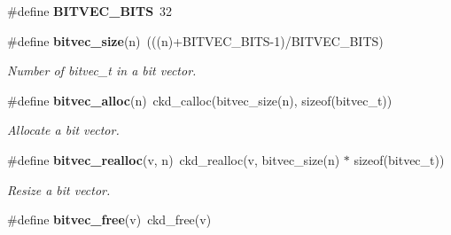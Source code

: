 \begin{CompactItemize}
\item 
\#define \textbf{BITVEC\_\-BITS}~32\label{bitvec_8h_a992f8d4c7dbe0b71bfd1e01ce279167}

\item 
\#define {\bf bitvec\_\-size}(n)~(((n)+BITVEC\_\-BITS-1)/BITVEC\_\-BITS)\label{bitvec_8h_1d82193826583f234a71cba32267d3f3}

\begin{CompactList}\small\item\em Number of bitvec\_\-t in a bit vector. \item\end{CompactList}\item 
\#define {\bf bitvec\_\-alloc}(n)~ckd\_\-calloc(bitvec\_\-size(n), sizeof(bitvec\_\-t))\label{bitvec_8h_866043a7ac23e137f6c2f2466f4abc70}

\begin{CompactList}\small\item\em Allocate a bit vector. \item\end{CompactList}\item 
\#define {\bf bitvec\_\-realloc}(v, n)~ckd\_\-realloc(v, bitvec\_\-size(n) $\ast$ sizeof(bitvec\_\-t))\label{bitvec_8h_e53ebce7c4c616fdc601e8306aebcc4b}

\begin{CompactList}\small\item\em Resize a bit vector. \item\end{CompactList}\item 
\#define {\bf bitvec\_\-free}(v)~ckd\_\-free(v)\label{bitvec_8h_5628e35c88ac7e91b99dce916758824a}


\end{CompactItemize}

